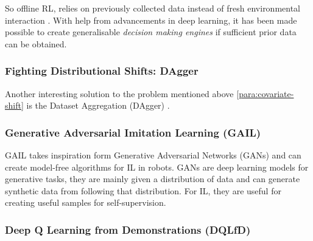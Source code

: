 So offline RL, relies on previously collected data instead of fresh environmental interaction \cite{levine2020offlinereinforcementlearningtutorial}. With help from advancements in deep learning, it has been made possible to create generalisable \emph{decision making engines} \cite{levine2020offlinereinforcementlearningtutorial} if sufficient prior data can be obtained.

\subsubsection{Fighting Distributional Shifts: DAgger}
Another interesting solution to the problem mentioned above \ref{para:covariate-shift} is the Dataset Aggregation (DAgger) \cite{ross2011reductionimitationlearningstructured}. 

\subsubsection{Generative Adversarial Imitation Learning (GAIL)}\label{sec:gail}

GAIL \cite{ho2016generativeadversarialimitationlearning}  takes inspiration form Generative Adversarial Networks (GANs) \cite{goodfellow2014generativeadversarialnetworks} and can create model-free algorithms for IL in robots. GANs are deep learning models for generative tasks, they are mainly given a distribution of data and can generate synthetic data from following that distribution. For IL, they are useful for creating useful samples for self-supervision.

\subsubsection{Deep Q Learning from Demonstrations (DQLfD)}
